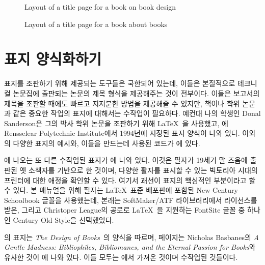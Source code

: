 \documentclass[10pt,a4paper]{oblivoir}
\begin{document}
\begin{figure}
\centering
\caption{Layout of a title page for a book on book design}\label{figure:titleDB}
\end{figure}

\begin{figure}
\centering
\caption{Layout of a title page for a book about books}\label{figure:titleGM}
\end{figure}

\section{표지 양식화하기}

표지를 조판하기 위해 제공되는 도구들은 국한되어 있는데, 이들은 본질적으로
테크니컬 논문집에 출판되는 논문의 제목 형식을 제공해주는 것이 전부이다.
이들은 보고서의 제목을 조판할 때에도 빠르고 지저분한 방법을 제공해줄 수 있지만,
책이나 학위 논문과 같은 중요한 작업의 표지에 대해서는 수작업이 필요하다.
예컨대 나의 학생인 Donal Sanderson은 그의 박사 학위 논문을 조판하기 위해
\LaTeX\ 을 사용했고, 에 Rensselear Polytechnic
Institute에서 1994년에 지정된 표지 양식이 나와 있다.
이외의 다양한 표지의 예시와, 이들을 만드는데 사용된 코드가 \cite{TITLEPAGES}에
있다.

\cite{TITLEPAGES}에 나오는 또 다른 수작업된 표지가 에 나와
있다.
이것은 필자가 19세기 말 즈음에 출판된 옛 소책자를 기반으로 한 것이며, 다양한
활자를 표시할 수 있는 빅토리아 시대의 프린터에 대한 애정을 확인할 수 있다.
여기서 괘선이 표지의 핵심적인 부분이라고 할 수 있다.
본 매뉴얼을 위해 필자는 \LaTeX\ 표준 배포판에 포함된 New Century Schoolbook
글꼴을 사용했는데, 본래는 SoftMaker/ATF 라이브러리에서 라이선스를 받은, 그리고 
Christoper League의 공로로 \LaTeX\ 을 지원하는 FontSite 글꼴 중 하나인 Century
Old Style을 선택했었다.

의 표지는 \textit{The Design of
Books}~\cite{ADRIANWILSON93}의 양식을 따르며, 페이지는 Nicholas Basbanes의
\textit{A Gentle Madness: Bibliophiles, Bibliomanes, and the Eternal Passion
for Books}와 유사한 것이 에 나와 있다.
이들 모두는 \cite{TITLEPAGES}에서 가져온 것이며 수작업된 것들이다.
\end{document}
